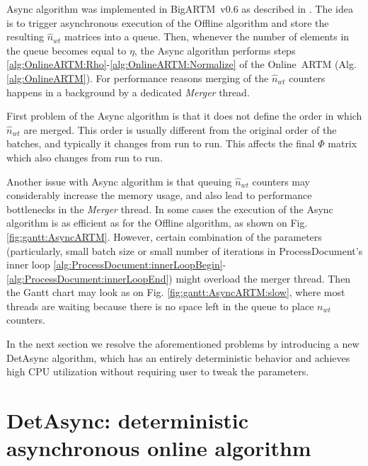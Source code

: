 \documentclass[russian,english]{llncs}
\newcommand{\kw}[1]{\mbox{\textsf{#1}}}
\begin{document}
\kw{Async} algorithm was implemented in \kw{BigARTM v0.6} as described in \cite{vfardi15aist}.
The idea is to trigger asynchronous execution of the \kw{Offline} algorithm
and store the resulting $\hat n_{wt}$ matrices into a queue.
Then, whenever the number of elements in the queue becomes equal to $\eta$,
the \kw{Async} algorithm performs steps \ref{alg:OnlineARTM:Rho}-\ref{alg:OnlineARTM:Normalize}
of the \kw{Online ARTM} (Alg. \ref{alg:OnlineARTM}).
For performance reasons merging of the $\hat n_{wt}$ counters happens in a background by a dedicated \emph{Merger} thread.

First problem of the \kw{Async} algorithm is that it does not define the order
in which $\hat n_{wt}$ are merged.
This order is usually different from the original order of the batches,
and typically it changes from run to run.
This affects the final $\Phi$ matrix which also changes from run to run.

Another issue with \kw{Async} algorithm is that
queuing $\hat n_{wt}$ counters may considerably increase the memory usage,
and also lead to performance bottlenecks in the \emph{Merger} thread.
In some cases the execution of the \kw{Async} algorithm is
as efficient as for the \kw{Offline} algorithm,
as shown on Fig. \ref{fig:gantt:AsyncARTM}.
However, certain combination of the parameters
(particularly, small batch size or small number of iterations in \kw{ProcessDocument}'s inner loop 
\ref{alg:ProcessDocument:innerLoopBegin}-\ref{alg:ProcessDocument:innerLoopEnd})
might overload the merger thread.
Then the Gantt chart may look as on Fig. \ref{fig:gantt:AsyncARTM:slow},
where most threads are waiting because there is no space left in the queue
to place $n_{wt}$ counters.

In the next section we resolve the aforementioned problems
by introducing a new \kw{DetAsync} algorithm,
which has an entirely deterministic behavior
and achieves high CPU utilization without requiring user to tweak the parameters.

\section{DetAsync: deterministic asynchronous online algorithm}
\label{sec:DetAsyncARTM}
\end{document}
